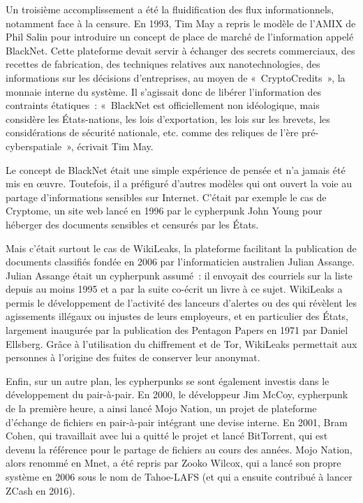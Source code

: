Un troisième accomplissement a été la fluidification des flux informationnels, notamment face à la censure. En 1993, Tim May a repris le modèle de l'AMIX de Phil Salin pour introduire un concept de place de marché de l'information appelé BlackNet. Cette plateforme devait servir à échanger des secrets commerciaux, des recettes de fabrication, des techniques relatives aux nanotechnologies, des informations sur les décisions d'entreprises, au moyen de «~CryptoCredits~», la monnaie interne du système. Il s'agissait donc de libérer l'information des contraints étatiques~: «~BlackNet est officiellement non idéologique, mais considère les États-nations, les lois d'exportation, les lois sur les brevets, les considérations de sécurité nationale, etc. comme des reliques de l'ère pré-cyberspatiale~», écrivait Tim May.

Le concept de BlackNet était une simple expérience de pensée et n'a jamais été mis en œuvre. Toutefois, il a préfiguré d'autres modèles qui ont ouvert la voie au partage d'informations sensibles sur Internet. C'était par exemple le cas de Cryptome, un site web lancé en 1996 par le cypherpunk John Young pour héberger des documents sensibles et censurés par les États.

Mais c'était surtout le cas de WikiLeaks, la plateforme facilitant la publication de documents classifiés fondée en 2006 par l'informaticien australien Julian Assange. Julian Assange était un cypherpunk assumé~: il envoyait des courriels sur la liste depuis au moins 1995 et a par la suite co-écrit un livre à ce sujet. WikiLeaks a permis le développement de l'activité des lanceurs d'alertes ou des  qui révèlent les agissements illégaux ou injustes de leurs employeurs, et en particulier des États, largement inaugurée par la publication des Pentagon Papers en 1971 par Daniel Ellsberg. Grâce à l'utilisation du chiffrement et de Tor, WikiLeaks permettait aux personnes à l'origine des fuites de conserver leur anonymat.

Enfin, sur un autre plan, les cypherpunks se sont également investis dans le développement du pair-à-pair. En 2000, le développeur Jim McCoy, cypherpunk de la première heure, a ainsi lancé Mojo Nation, un projet de plateforme d'échange de fichiers en pair-à-pair intégrant une devise interne. En 2001, Bram Cohen, qui travaillait avec lui a quitté le projet et lancé BitTorrent, qui est devenu la référence pour le partage de fichiers au cours des années. Mojo Nation, alors renommé en Mnet, a été repris par Zooko Wilcox, qui a lancé son propre système en 2006 sous le nom de Tahoe-LAFS (et qui a ensuite contribué à lancer ZCash en 2016). %

